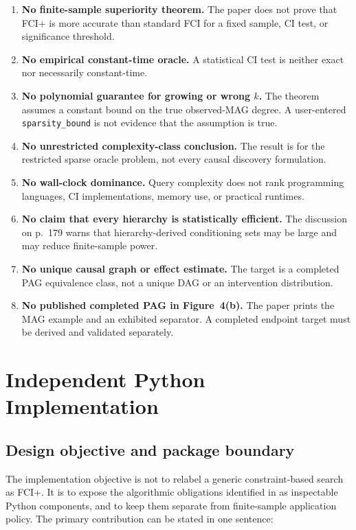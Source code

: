 \documentclass[11pt,a4paper,oneside]{report}
\newcommand{\code}[1]{\texttt{#1}}
\begin{document}
\begin{enumerate}[leftmargin=2em]
  \item \textbf{No finite-sample superiority theorem.}  The paper does not
        prove that FCI+ is more accurate than standard FCI for a fixed sample,
        CI test, or significance threshold.
  \item \textbf{No empirical constant-time oracle.}  A statistical CI test is
        neither exact nor necessarily constant-time.
  \item \textbf{No polynomial guarantee for growing or wrong \(k\).}  The
        theorem assumes a constant bound on the true observed-MAG degree.  A
        user-entered \code{sparsity\_bound} is not evidence that the assumption
        is true.
  \item \textbf{No unrestricted complexity-class conclusion.}  The result is
        for the restricted sparse oracle problem, not every causal discovery
        formulation.
  \item \textbf{No wall-clock dominance.}  Query complexity does not rank
        programming languages, CI implementations, memory use, or practical
        runtimes.
  \item \textbf{No claim that every hierarchy is statistically efficient.}
        The discussion on p.~179 warns that hierarchy-derived conditioning
        sets may be large and may reduce finite-sample power.
  \item \textbf{No unique causal graph or effect estimate.}  The target is a
        completed PAG equivalence class, not a unique DAG or an intervention
        distribution.
  \item \textbf{No published completed PAG in Figure~4(b).}  The paper prints
        the MAG example and an exhibited separator.  A completed endpoint
        target must be derived and validated separately.
\end{enumerate}


\chapter{Independent Python Implementation}
\label{chap:implementation}

\section{Design objective and package boundary}

The implementation objective is not to relabel a generic constraint-based
search as FCI+.  It is to expose the algorithmic obligations identified in
 as inspectable Python
components, and to keep them separate from finite-sample application policy.
The primary contribution can be stated in one sentence:
\end{document}
